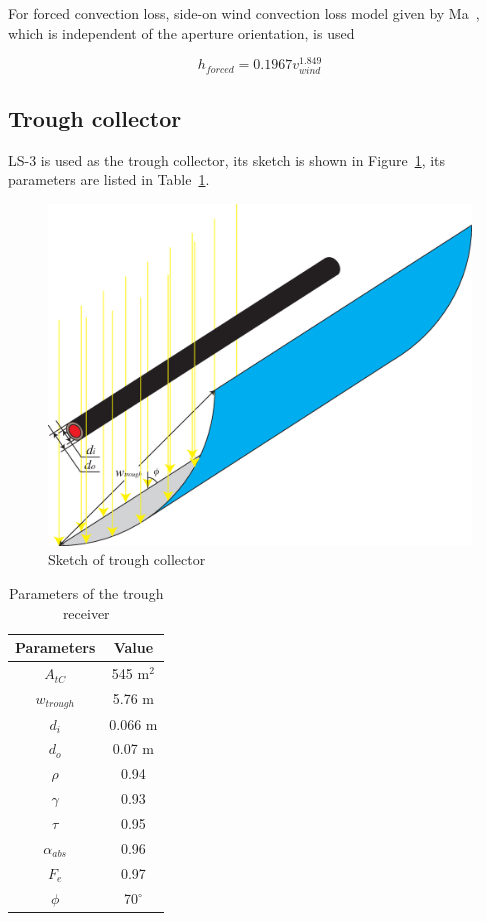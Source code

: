 \documentclass{article}
\begin{document}
For forced convection loss, side-on wind convection loss model given by Ma~\cite{Ma1993}, which is independent of the aperture orientation, is used

\begin{equation*}
	h_{forced}=0.1967v_{wind}^{1.849}
\end{equation*}

\subsection{Trough collector}

LS-3 is used as the trough collector, its sketch is shown in Figure~\ref{fig:tC}, its parameters are listed in Table~\ref{tab:tC}.

\noindent \begin{figure}[htbp]
\begin{center}
	\includegraphics[width = 0.7\columnwidth]{./graphics/troughCollector}
	\caption{Sketch of trough collector}
	\label{fig:tC}
\end{center}
\end{figure}

\begin{table}[htbp]
	\caption{Parameters of the trough receiver}
	\begin{center}
	\begin{tabular}{cc}
		\toprule
		Parameters	&	Value\\
		\midrule
		$A_{tC}$	&	545 m$^2$\\
		$w_{trough}$&	5.76 m\\
		$d_i$		&	0.066 m\\
		$d_o$	&	0.07 m\\
		$\rho$		&	0.94\\
		$\gamma$	&	0.93\\
		$\tau$		&	0.95\\
		$\alpha_{abs}$	&	0.96\\
		$F_e$		&	0.97\\
		$\phi$	&	70$^\circ$\\
		\bottomrule
	\end{tabular}
	\end{center}
	\label{tab:tC}
\end{table}
\end{document}

